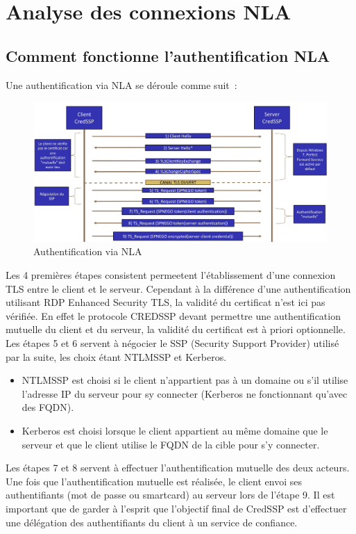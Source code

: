 \newpage

\section{Analyse des connexions NLA}
\subsection{Comment fonctionne l'authentification NLA}
Une authentification via NLA se d\'eroule comme suit :





\begin{figure}[ht]
  \centering
  \includegraphics[width=1\textwidth]{AnalyseRDP/img/schema.jpg}
  \caption{Authentification via NLA}
  \label{fig:AnalyseRDP:archi}
\end{figure}


Les 4 premières \'etapes consistent permeetent l'\'etablissement d'une connexion TLS entre le client et le serveur. Cependant à la différence d’une authentification utilisant RDP Enhanced Security TLS, la validité du certificat n’est ici pas vérifiée. En effet le protocole CREDSSP devant permettre une authentification mutuelle du client et du serveur, la validité du certificat est à priori optionnelle.
Les \'etapes 5 et 6 servent à négocier le SSP (Security Support Provider) utilisé par la suite, les choix étant NTLMSSP et Kerberos.
\begin{itemize}
	\item NTLMSSP est choisi si le client n’appartient pas à un domaine ou s'il utilise l’adresse IP du serveur pour sy connecter (Kerberos ne fonctionnant qu'avec des FQDN).
	\item Kerberos est choisi lorsque le client appartient au même domaine que le serveur et que le client utilise le FQDN de la cible pour s'y connecter.
\end{itemize}
Les \'etapes 7 et 8 servent à effectuer l’authentification mutuelle des deux acteurs.
Une fois que l'authentification mutuelle est r\'ealisée, le client envoi ses authentifiants (mot de passe ou smartcard) au serveur lors de l'étape 9. Il est important que de garder à l'esprit que l'objectif final de CredSSP est d'effectuer une délégation des authentifiants du client à un service de confiance. 

